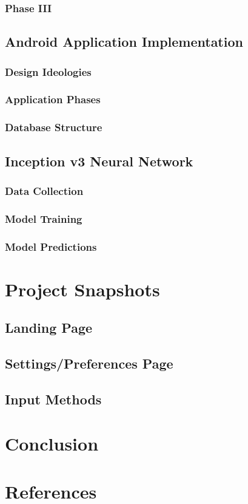 \documentclass{article}
\begin{document}
			\subsubsection{Phase III}

		\subsection{Android Application Implementation}
			\subsubsection{Design Ideologies}
			\subsubsection{Application Phases}
			\subsubsection{Database Structure}
		
		\subsection{Inception v3 Neural Network}
			\subsubsection{Data Collection}
			\subsubsection{Model Training}
			\subsubsection{Model Predictions}


	\newpage


	\section{Project Snapshots}

		\subsection{Landing Page}
		\subsection{Settings/Preferences Page}
		\subsection{Input Methods}

	\newpage


	\section{Conclusion}

	\newpage


	\section{References}

	\newpage
\end{document}
